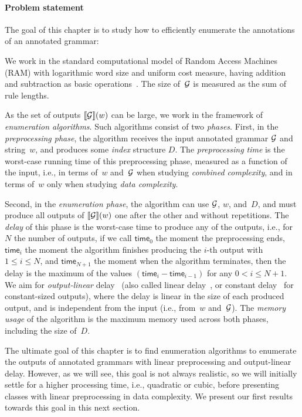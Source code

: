 \paragraph{Problem statement} 
The goal of this chapter is to study how to efficiently enumerate the
annotations of an annotated grammar:
%
%
%
%
%
%
%
%
\smallskip

\begin{center}
\end{center}
\smallskip
We work in the standard computational model of Random Access Machines (RAM)
with logarithmic word size and
uniform cost measure, having addition and subtraction as basic
operations~\cite{AhoHU74}. The size of~$\mathcal{G}$ is measured as the sum of rule lengths.
%
%

As the set of outputs ${\llbracket{\mathcal{G}}\rrbracket}(w)$ can be large, we
work in the framework of \emph{enumeration algorithms}.
Such algorithms consist of two \emph{phases}.
%
First, in the \emph{preprocessing phase},
the algorithm receives the input annotated grammar $\mathcal{G}$ and string~$w$, and produces some
\emph{index} structure $D$.
The \emph{preprocessing time} is the worst-case running time of this
preprocessing phase, measured as a function of the input, i.e., in terms of~$w$
and~$\mathcal{G}$ when studying \emph{combined complexity}, and in terms of~$w$ only
when studying \emph{data complexity}.

Second, in the \emph{enumeration phase}, the algorithm can use $\mathcal{G}$, $w$, and~$D$,
and must produce all outputs of ${\llbracket{\mathcal{G}}\rrbracket}(w)$
one after the other and without
repetitions. The \emph{delay} of this phase is the worst-case time to
produce any of the outputs, i.e., for $N$ the number of outputs,
if we call $\mathsf{time}_0$ the moment the preprocessing ends, 
$\mathsf{time}_i$ the moment the algorithm finishes producing the $i$-th output
with $1 \leq i \leq N$, and 
$\mathsf{time}_{N+1}$ the moment when the algorithm terminates,
then the delay is the maximum of the values $(\mathsf{time}_i - \mathsf{time}_{i-1})$ for any 
$0 < i \leq N+1$.
We aim for \emph{output-linear} delay~\cite{FlorenzanoRUVV20} (also called linear delay~\cite{Courcelle09}, or constant delay~\cite{Segoufin13}
for constant-sized outputs), where the delay is
linear in the size of each produced output, and is independent from the input
(i.e., from~$w$ and~$\mathcal{G}$).
The \emph{memory usage} of the algorithm is the maximum memory
used across both phases, including the size of~$D$.

The ultimate goal of this chapter is to find enumeration algorithms to enumerate
the outputs of annotated grammars
with linear preprocessing and
output-linear delay.  However, as we will see, this goal
is not always realistic, so we will initially settle for a higher
processing time, i.e., quadratic or cubic, before presenting classes with linear
preprocessing in data complexity.  We present our first results
towards this goal in this next section.

